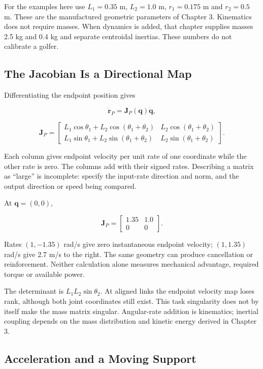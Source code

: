 For the examples here use \(L_1=0.35\) m, \(L_2=1.0\) m, \(r_1=0.175\) m and \(r_2=0.5\) m. These are the manufactured geometric parameters of Chapter 3. Kinematics does not require masses. When dynamics is added, that chapter supplies masses 2.5 kg and 0.4 kg and separate centroidal inertias. These numbers do not calibrate a golfer.

\subsection{The Jacobian Is a Directional Map}\label{ch02:the-jacobian-is-a-directional-map}

\protect{}\label{ch02:velocity-kinematics}{}

Differentiating the endpoint position gives

\[
\dot{\bm r}_P=\bm J_P(\bm q)\dot{\bm q},
\]

\[
\bm J_P=
\begin{bmatrix}
L_1\cos\theta_1+L_2\cos(\theta_1+\theta_2)&L_2\cos(\theta_1+\theta_2)\\
L_1\sin\theta_1+L_2\sin(\theta_1+\theta_2)&L_2\sin(\theta_1+\theta_2)
\end{bmatrix}.
\]

Each column gives endpoint velocity per unit rate of one coordinate while the other rate is zero. The columns add with their signed rates. Describing a matrix as ``large'' is incomplete: specify the input-rate direction and norm, and the output direction or speed being compared.

At \(\bm q=(0,0)\),

\[
\bm J_P=\begin{bmatrix}1.35&1.0\\0&0\end{bmatrix}.
\]

Rates \((1,-1.35)\) rad/s give zero instantaneous endpoint velocity; \((1,1.35)\) rad/s give 2.7 m/s to the right. The same geometry can produce cancellation or reinforcement. Neither calculation alone measures mechanical advantage, required torque or available power.

The determinant is \(L_1L_2\sin\theta_2\). At aligned links the endpoint velocity map loses rank, although both joint coordinates still exist. This task singularity does not by itself make the mass matrix singular. Angular-rate addition is kinematics; inertial coupling depends on the mass distribution and kinetic energy derived in Chapter 3.

\subsection{Acceleration and a Moving Support}\label{ch02:acceleration-and-a-moving-support}

